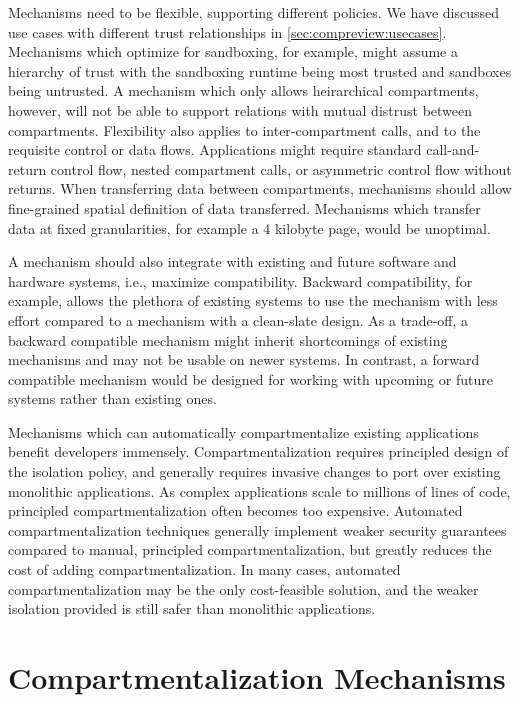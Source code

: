 Mechanisms need to be flexible, supporting different policies.
We have discussed use cases with different trust relationships in 
\autoref{sec:compreview:usecases}.
Mechanisms which optimize for sandboxing, for example, might assume
a hierarchy of trust with the sandboxing runtime being most trusted
and sandboxes being untrusted.
A mechanism which only allows heirarchical compartments, however,
will not be able to support relations with mutual distrust between
compartments.
Flexibility also applies to inter-compartment calls, and to the requisite
control or data flows.
Applications might require standard call-and-return control flow,
nested compartment calls, or asymmetric control flow without returns.
When transferring data between compartments, mechanisms should allow
fine-grained spatial definition of data transferred.
Mechanisms which transfer data at fixed granularities, for example a
4 kilobyte page, would be unoptimal.

A mechanism should also integrate with existing and future software and
hardware systems, i.e., maximize compatibility.
Backward compatibility, for example, allows the plethora of existing systems
to use the mechanism with less effort compared to a 
mechanism with a clean-slate design.
As a trade-off, a backward compatible mechanism might inherit shortcomings
of existing mechanisms and may not be usable on newer systems.
In contrast, a forward compatible mechanism would be designed for working
with upcoming or future systems rather than existing ones.

Mechanisms which can automatically compartmentalize existing applications
benefit developers immensely.
Compartmentalization requires principled design of the isolation policy,
and generally requires invasive changes to port over existing monolithic
applications.
As complex applications scale to millions of lines of code,
principled compartmentalization often becomes too expensive.
Automated compartmentalization techniques generally implement weaker
security guarantees compared to manual, principled compartmentalization,
but greatly reduces the cost of adding compartmentalization.
In many cases, automated compartmentalization may be the only 
cost-feasible solution, and the weaker isolation provided is still
safer than monolithic applications.

\section{Compartmentalization Mechanisms}
\label{sec:compreview:mechanisms}

